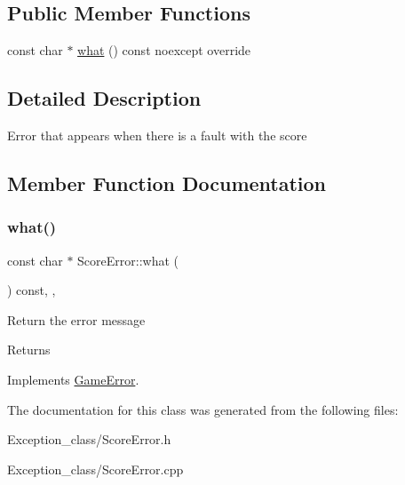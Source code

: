 \subsection*{Public Member Functions}
\begin{DoxyCompactItemize}
\item 
const char $\ast$ \hyperlink{classScoreError_a56e2018c9c0c9d34b482533aa983d37d}{what} () const noexcept override
\end{DoxyCompactItemize}


\subsection{Detailed Description}
Error that appears when there is a fault with the score 

\subsection{Member Function Documentation}
\mbox{\label{classScoreError_a56e2018c9c0c9d34b482533aa983d37d}} 
\subsubsection{\texorpdfstring{what()}{what()}}
{\footnotesize\ttfamily const char $\ast$ Score\+Error\+::what (\begin{DoxyParamCaption}{ }\end{DoxyParamCaption}) const\hspace{0.3cm}{\ttfamily [override]}, {\ttfamily [virtual]}, {\ttfamily [noexcept]}}

Return the error message \begin{DoxyReturn}{Returns}

\end{DoxyReturn}


Implements \hyperlink{classGameError_afbe93d6a2023f2824be2733aff9e86cb}{Game\+Error}.



The documentation for this class was generated from the following files\+:\begin{DoxyCompactItemize}
\item 
Exception\+\_\+class/Score\+Error.\+h\item 
Exception\+\_\+class/Score\+Error.\+cpp\end{DoxyCompactItemize}
